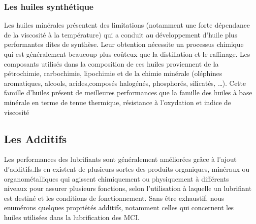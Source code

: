 \subsubsection{Les huiles synthétique}
Les huiles minérales présentent des limitations (notamment une forte dépendance de la viscosité à la température) qui a conduit au développement d’huile plus performantes dites de synthèse. Leur obtention nécessite un processus chimique qui est généralement beaucoup plus coûteux que la distillation et le raffinage. Les composants utilisés dans la composition de ces huiles proviennent de la pétrochimie, carbochimie, lipochimie et de la chimie minérale (oléphines aromatiques, alcools, acides,composés halogénés, phosphorés, silicatés, …). Cette famille d’huiles présent de meilleures performances que la famille des huiles à base minérale en terme de tenue thermique, résistance à l’oxydation et indice de viscosité

\subsection{Les Additifs}\label{additifs}
Les performances des lubrifiants sont généralement améliorées grâce à l’ajout d’additifs.Ils en existent de plusieurs sortes des produits organiques, minéraux ou organométalliques qui agissent chimiquement ou physiquement à différents niveaux pour assurer plusieurs fonctions, selon l’utilisation à laquelle un lubrifiant est destiné et les conditions de fonctionnement. Sans être exhaustif, nous enumérons quelques propriétés additifs, notamment celles qui concernent les huiles utilisées dans la lubrification des MCI.\cite{initiation}\\

